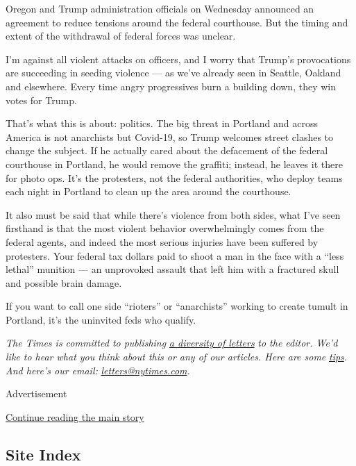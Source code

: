 Oregon and Trump administration officials on Wednesday announced an
agreement to reduce tensions around the federal courthouse. But the
timing and extent of the withdrawal of federal forces was unclear.

I'm against all violent attacks on officers, and I worry that Trump's
provocations are succeeding in seeding violence --- as we've already
seen in Seattle, Oakland and elsewhere. Every time angry progressives
burn a building down, they win votes for Trump.

That's what this is about: politics. The big threat in Portland and
across America is not anarchists but Covid-19, so Trump welcomes street
clashes to change the subject. If he actually cared about the defacement
of the federal courthouse in Portland, he would remove the graffiti;
instead, he leaves it there for photo ops. It's the protesters, not the
federal authorities, who deploy teams each night in Portland to clean up
the area around the courthouse.

It also must be said that while there's violence from both sides, what
I've seen firsthand is that the most violent behavior overwhelmingly
comes from the federal agents, and indeed the most serious injuries have
been suffered by protesters. Your federal tax dollars paid to shoot a
man in the face with a ``less lethal'' munition --- an unprovoked
assault that left him with a fractured skull and possible brain damage.

If you want to call one side ``rioters'' or ``anarchists'' working to
create tumult in Portland, it's the uninvited feds who qualify.

\emph{The Times is committed to publishing}
\href{https://www.nytimes.com/2019/01/31/opinion/letters/letters-to-editor-new-york-times-women.html}{\emph{a
diversity of letters}} \emph{to the editor. We'd like to hear what you
think about this or any of our articles. Here are some}
\href{https://help.nytimes.com/hc/en-us/articles/115014925288-How-to-submit-a-letter-to-the-editor}{\emph{tips}}\emph{.
And here's our email:}
\href{mailto:letters@nytimes.com}{\emph{letters@nytimes.com}}\emph{.}

Advertisement

\protect\hyperlink{after-bottom}{Continue reading the main story}

\hypertarget{site-index}{%
\subsection{Site Index}\label{site-index}}


